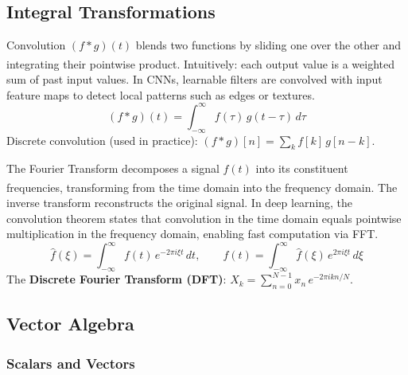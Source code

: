     \subsection{Integral Transformations}
    \begin{tcbitemize}[ skin=sectionraster ]

        \tcbitem[title=Convolution, raster multicolumn=6]
        Convolution $(f * g)(t)$ blends two functions by sliding one over the other and integrating their pointwise product\textsuperscript{\cite{bronsteinTaschenbuchMathematik2001}}. Intuitively: each output value is a weighted sum of past input values. In CNNs, learnable filters are convolved with input feature maps to detect local patterns such as edges or textures.
        \tcblower
        \begin{equation}
            (f * g)(t) = \int_{-\infty}^{\infty} f(\tau)\, g(t - \tau)\, d\tau
        \end{equation}
        Discrete convolution (used in practice): $(f * g)[n] = \sum_{k} f[k]\, g[n-k]$.

        \tcbitem[title={Fourier Transformation}, raster multicolumn=6]
        The Fourier Transform decomposes a signal $f(t)$ into its constituent frequencies, transforming from the time domain into the frequency domain\textsuperscript{\cite{bronsteinTaschenbuchMathematik2001}}. The inverse transform reconstructs the original signal. In deep learning, the convolution theorem states that convolution in the time domain equals pointwise multiplication in the frequency domain, enabling fast computation via FFT.
        \tcblower
        \begin{equation}
            \hat{f}(\xi) = \int_{-\infty}^{\infty} f(t)\, e^{-2\pi i \xi t}\, dt, \qquad
            f(t) = \int_{-\infty}^{\infty} \hat{f}(\xi)\, e^{2\pi i \xi t}\, d\xi
        \end{equation}
        The \textbf{Discrete Fourier Transform (DFT)}: $X_k = \sum_{n=0}^{N-1} x_n\, e^{-2\pi i kn/N}$.

    \end{tcbitemize}

    \subsection{Vector Algebra}
    \subsubsection{Scalars and Vectors}

